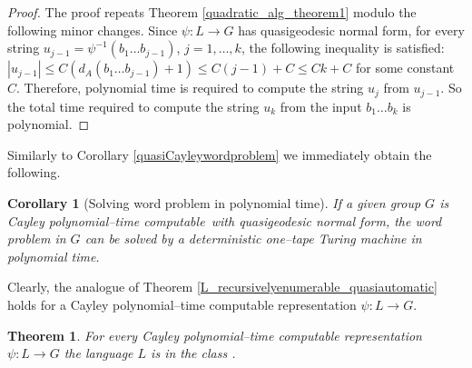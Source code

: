 \documentclass[article,12pt]{elsarticle}
\newtheorem{theorem}{Theorem}
\newtheorem{corollary}{Corollary}
\newcommand\polyC{Cayley polynomial--time computable}
\begin{document}
\begin{proof} 
	The proof repeats Theorem \ref{quadratic_alg_theorem1}
	modulo the following minor changes. 
	Since $\psi: L \rightarrow G$ has
	quasigeodesic normal form, for every string 
	$u_{j-1} = \psi^{-1}(b_1 \dots b_{j-1})$,  
	$j=1,\dots,k$, the following inequality is satisfied: 
	$|u_{j-1}| \leqslant  C(d_A (b_1 \dots b_{j-1}) +1)
	\leqslant C (j-1) + C \leqslant C k + C$ 
	for some constant $C$. 
	Therefore, polynomial time is required to compute 
	the string $u_{j}$ from $u_{j-1}$. So the total 
	time required to compute the string $u_k$ from 
	the input $b_1\dots b_k$ is polynomial.         
\end{proof}	 
Similarly to Corollary \ref{quasiCayleywordproblem} 
we immediately obtain the following. 
\begin{corollary}[Solving word problem in polynomial time]
	\label{wordproblempoltime_cor}   
	If a given group $G$ is \polyC\ with 
    quasigeodesic normal form, the 
	word problem in $G$ can be solved by a deterministic 
	one--tape Turing machine in polynomial time.  	
\end{corollary}	
Clearly, the analogue of Theorem \ref{L_recursivelyenumerable_quasiautomatic} holds 
for a Cayley polynomial--time computable 
representation 
$\psi : L \rightarrow G$. 
\begin{theorem} 
	\label{caypoltime_normforms_recenum}	
	For every Cayley polynomial--time computable 
	representation $\psi : L \rightarrow G$ the 
	language $L$ is in the class \RE.   
\end{theorem}	 
\end{document}

